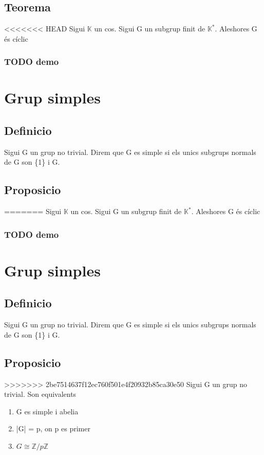 \documentclass[11pt]{article}
\begin{document}
\subsection{Teorema}
<<<<<<< HEAD
\label{sec:org36d75b9}
Sigui \(\mathbb{K}\) un cos. Sigui G un subgrup finit de \(\mathbb{K}^*\). Aleshores G és cíclic

\subsubsection{{\bfseries\sffamily TODO} demo}
\label{sec:org5059f11}

\section{Grup simples}
\label{sec:org6302674}
\subsection{Definicio}
\label{sec:orgba15b2f}
Sigui G un grup no trivial. Direm que G es simple si els unics subgrups normals de G son \{1\} i G.
\subsection{Proposicio}
\label{sec:org3f658bb}
=======
\label{sec:org104c809}
Sigui \(\mathbb{K}\) un cos. Sigui G un subgrup finit de \(\mathbb{K}^*\). Aleshores G és cíclic

\subsubsection{{\bfseries\sffamily TODO} demo}
\label{sec:orgd8cc7f2}

\section{Grup simples}
\label{sec:org62e99aa}
\subsection{Definicio}
\label{sec:org727421f}
Sigui G un grup no trivial. Direm que G es simple si els unics subgrups normals de G son \{1\} i G.
\subsection{Proposicio}
\label{sec:org2bc91bb}
>>>>>>> 2be7514637f12ec760f501e4f20932b85ca30e50
Sigui G un grup no trivial. Son equivalents
\begin{enumerate}
\item G es simple i abelia
\item |G| = p, on p es primer
\item \(G \cong \mathbb{Z}/p\mathbb{Z}\)
\end{enumerate}
\end{document}
